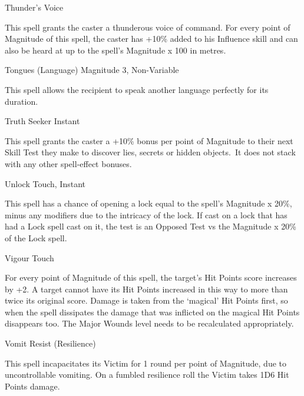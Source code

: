 \begin{rpg-spell}
{Thunder's Voice}
{}

This spell grants the caster a thunderous voice of command. For every point of Magnitude of this spell, the caster has +10\% added to his Influence skill and can also be heard at up to the spell’s Magnitude x 100 in metres.
\end{rpg-spell}


\begin{rpg-spell}
{Tongues (Language)}
{Magnitude 3, Non-Variable} %

This spell allows the recipient to speak another language perfectly for its duration. %
\end{rpg-spell}


\begin{rpg-spell}
{Truth Seeker}
{Instant}

This spell grants the caster a +10\% bonus per point of Magnitude to their next Skill Test they make to discover lies, secrets or hidden objects. It does not stack with any other spell-effect bonuses.
\end{rpg-spell}


\begin{rpg-spell}
{Unlock}
{Touch, Instant}

This spell has a chance of opening a lock equal to the spell’s Magnitude x 20\%, minus any modifiers due to the intricacy of the lock. If cast on a lock that has had a Lock spell cast on it, the test is an Opposed Test vs the Magnitude x 20\% of the Lock spell.
\end{rpg-spell}


\begin{rpg-spell}
{Vigour}
{Touch}

For every point of Magnitude of this spell, the target’s Hit Points score increases by +2. A target cannot have its Hit Points increased in this way to more than twice its original score. Damage is taken from the ‘magical’ Hit Points first, so when the spell dissipates the damage that was inflicted on the magical Hit Points disappears too. The Major Wounds level needs to be recalculated appropriately.
\end{rpg-spell}


\begin{rpg-spell}
{Vomit}
{Resist (Resilience)}

This spell incapacitates its Victim for 1 round per point of Magnitude, due to uncontrollable vomiting. On a fumbled resilience roll the Victim takes 1D6 Hit Points damage.
\end{rpg-spell}


